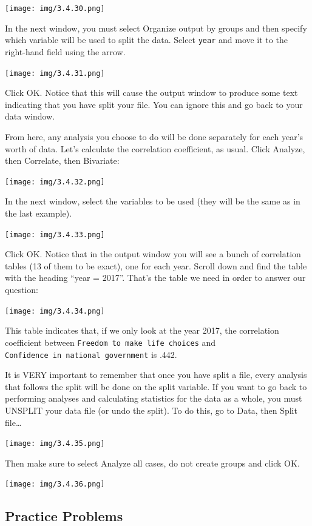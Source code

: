 \documentclass[]{book}
\begin{document}
\texttt{[image: img/3.4.30.png]}

In the next window, you must select {Organize output by groups} and then
specify which variable will be used to split the data. Select
\texttt{year} and move it to the right-hand field using the arrow.

\texttt{[image: img/3.4.31.png]}

Click {OK}. Notice that this will cause the output window to produce
some text indicating that you have split your file. You can ignore this
and go back to your data window.

From here, any analysis you choose to do will be done separately for
each year's worth of data. Let's calculate the correlation coefficient,
as usual. Click {Analyze}, then {Correlate}, then {Bivariate}:

\texttt{[image: img/3.4.32.png]}

In the next window, select the variables to be used (they will be the
same as in the last example).

\texttt{[image: img/3.4.33.png]}

Click {OK}. Notice that in the output window you will see a bunch of
correlation tables (13 of them to be exact), one for each year. Scroll
down and find the table with the heading ``year = 2017''. That's the
table we need in order to answer our question:

\texttt{[image: img/3.4.34.png]}

This table indicates that, if we only look at the year 2017, the
correlation coefficient between
\texttt{Freedom\ to\ make\ life\ choices} and
\texttt{Confidence\ in\ national\ government} is .442.

It is VERY important to remember that once you have split a file, every
analysis that follows the split will be done on the split variable. If
you want to go back to performing analyses and calculating statistics
for the data as a whole, you must UNSPLIT your data file (or undo the
split). To do this, go to {Data}, then {Split file\ldots{}}

\texttt{[image: img/3.4.35.png]}

Then make sure to select {Analyze all cases, do not create groups} and
click {OK}.

\texttt{[image: img/3.4.36.png]}

\subsection{Practice Problems}\label{practice-problems-2}
\end{document}
